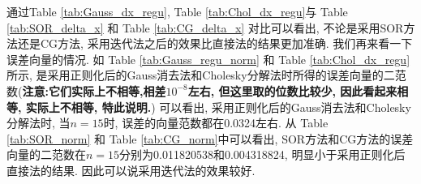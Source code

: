 \documentclass[a4paper]{article}
\begin{document}
\begin{CJK*}{GBK}{song}
通过Table \ref{tab:Gauss_dx_regu}, Table \ref{tab:Chol_dx_regu}与 Table \ref{tab:SOR_delta_x} 和 Table \ref{tab:CG_delta_x} 对比可以看出, 不论是采用SOR方法还是CG方法, 采用迭代法之后的效果比直接法的结果更加准确. 我们再来看一下误差向量的情况. 如 Table \ref{tab:Gauss_regu_norm} 和 Table \ref{tab:Chol_dx_regu}所示, 是采用正则化后的Gauss消去法和Cholesky分解法时所得的误差向量的二范数(\textbf{注意:它们实际上不相等,相差$10^{-8}$左右, 但这里取的位数比较少, 因此看起来相等, 实际上不相等, 特此说明.}) 可以看出, 采用正则化后的Gauss消去法和Cholesky分解法时, 当$n=15$时, 误差的向量范数都在0.0324左右. 从 Table \ref{tab:SOR_norm} 和 Table \ref{tab:CG_norm}中可以看出, SOR方法和CG方法的误差向量的二范数在$n=15$分别为0.011820538和0.004318824, 明显小于采用正则化后直接法的结果. 因此可以说采用迭代法的效果较好.
\begin{center}
\begin{table*}[!htbp]
\end{table*}
\end{center}
\end{CJK*}
\end{document}
